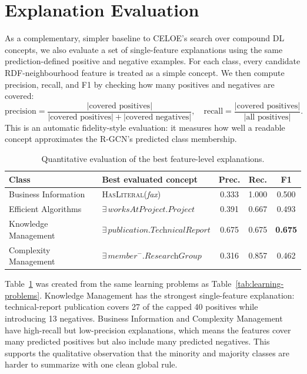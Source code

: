\documentclass[runningheads]{llncs}
\begin{document}
\section{Explanation Evaluation}

As a complementary, simpler baseline to CELOE's search over compound DL concepts, we also evaluate a set of
single-feature explanations using the same prediction-defined positive and negative examples.  For each
class, every candidate RDF-neighbourhood feature is treated as a simple concept.  We then compute precision,
recall, and F1 by checking how many positives and negatives are covered:
\[
\text{precision}=\frac{|\text{covered positives}|}{|\text{covered positives}|+|\text{covered negatives}|},
\quad
\text{recall}=\frac{|\text{covered positives}|}{|\text{all positives}|}.
\]
This is an automatic fidelity-style evaluation: it measures how well a readable concept approximates the
R-GCN's predicted class membership.

\begin{table}[ht]
\centering
\caption{Quantitative evaluation of the best feature-level explanations.}
\label{tab:explanation-eval}
\begin{tabular}{p{3.1cm}p{4.2cm}ccc}
\toprule
\textbf{Class} & \textbf{Best evaluated concept} & \textbf{Prec.} & \textbf{Rec.} & \textbf{F1} \\
\midrule
Business Information
  & \textsc{HasLiteral}(\textit{fax})
  & 0.333 & 1.000 & 0.500 \\
Efficient Algorithms
  & $\exists\,\textit{worksAtProject}.\textit{Project}$
  & 0.391 & 0.667 & 0.493 \\
Knowledge Management
  & $\exists\,\textit{publication}.\textit{TechnicalReport}$
  & 0.675 & 0.675 & \textbf{0.675} \\
Complexity Management
  & $\exists\,\textit{member}^{-}.\textit{ResearchGroup}$
  & 0.316 & 0.857 & 0.462 \\
\bottomrule
\end{tabular}
\end{table}

Table~\ref{tab:explanation-eval} was created from the same learning problems as
Table~\ref{tab:learning-problems}.  Knowledge Management has the strongest single-feature explanation:
technical-report publication covers 27 of the capped 40 positives while introducing 13 negatives.  Business
Information and Complexity Management have high-recall but low-precision explanations, which means the
features cover many predicted positives but also include many predicted negatives.  This supports the
qualitative observation that the minority and majority classes are harder to summarize with one clean
global rule.
\end{document}
